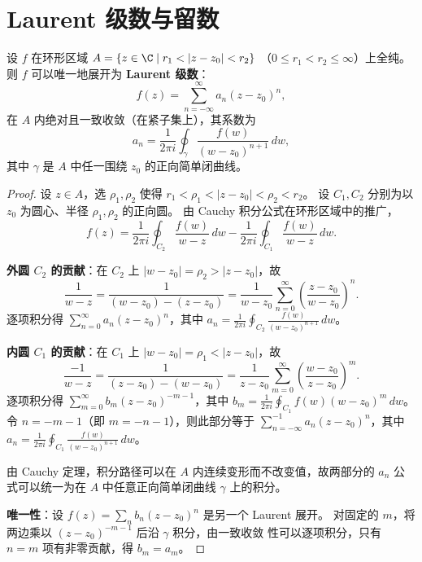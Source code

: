 \section{Laurent 级数与留数}
\label{sec:laurent}

\begin{theorem}[Laurent 展开]
\label{thm:laurent}
设 $f$ 在环形区域 $A = \{z \in \C \mid r_1 < |z - z_0| < r_2\}$
（$0 \leq r_1 < r_2 \leq \infty$）上全纯。则 $f$ 可以唯一地展开为
\textbf{Laurent 级数}：
\[
  f(z) = \sum_{n=-\infty}^{\infty} a_n (z - z_0)^n,
\]
在 $A$ 内绝对且一致收敛（在紧子集上），其系数为
\[
  a_n = \frac{1}{2\pi i} \oint_\gamma
  \frac{f(w)}{(w - z_0)^{n+1}}\, dw,
\]
其中 $\gamma$ 是 $A$ 中任一围绕 $z_0$ 的正向简单闭曲线。
\end{theorem}

\begin{proof}
设 $z \in A$，选 $\rho_1, \rho_2$ 使得 $r_1 < \rho_1 < |z - z_0| < \rho_2 < r_2$。
设 $C_1, C_2$ 分别为以 $z_0$ 为圆心、半径 $\rho_1, \rho_2$ 的正向圆。
由 Cauchy 积分公式在环形区域中的推广，
\[
  f(z) = \frac{1}{2\pi i} \oint_{C_2} \frac{f(w)}{w - z}\, dw
       - \frac{1}{2\pi i} \oint_{C_1} \frac{f(w)}{w - z}\, dw.
\]

\textbf{外圆 $C_2$ 的贡献}：在 $C_2$ 上 $|w - z_0| = \rho_2 > |z - z_0|$，故
\[
  \frac{1}{w - z} = \frac{1}{(w-z_0) - (z-z_0)}
  = \frac{1}{w-z_0} \sum_{n=0}^{\infty}
    \left(\frac{z - z_0}{w - z_0}\right)^n.
\]
逐项积分得 $\sum_{n=0}^{\infty} a_n (z - z_0)^n$，其中
$a_n = \frac{1}{2\pi i} \oint_{C_2} \frac{f(w)}{(w-z_0)^{n+1}}\, dw$。

\textbf{内圆 $C_1$ 的贡献}：在 $C_1$ 上 $|w - z_0| = \rho_1 < |z - z_0|$，故
\[
  \frac{-1}{w - z} = \frac{1}{(z - z_0) - (w - z_0)}
  = \frac{1}{z - z_0} \sum_{m=0}^{\infty}
    \left(\frac{w - z_0}{z - z_0}\right)^m.
\]
逐项积分得
$\sum_{m=0}^{\infty} b_m (z - z_0)^{-m-1}$，其中
$b_m = \frac{1}{2\pi i} \oint_{C_1} f(w)(w - z_0)^m\, dw$。
令 $n = -m - 1$（即 $m = -n - 1$），则此部分等于
$\sum_{n=-\infty}^{-1} a_n (z - z_0)^n$，其中
$a_n = \frac{1}{2\pi i} \oint_{C_1} \frac{f(w)}{(w-z_0)^{n+1}}\, dw$。

由 Cauchy 定理，积分路径可以在 $A$ 内连续变形而不改变值，故两部分的
$a_n$ 公式可以统一为在 $A$ 中任意正向简单闭曲线 $\gamma$ 上的积分。

\textbf{唯一性}：设 $f(z) = \sum_{n} b_n (z - z_0)^n$ 是另一个 Laurent 展开。
对固定的 $m$，将两边乘以 $(z - z_0)^{-m-1}$ 后沿 $\gamma$ 积分，由一致收敛
性可以逐项积分，只有 $n = m$ 项有非零贡献，得 $b_m = a_m$。
\end{proof}

